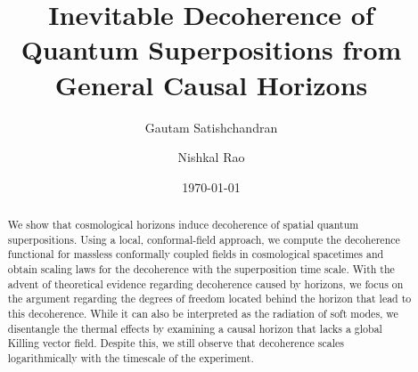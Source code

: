 \documentclass[aps,twocolumn,prd,nofootinbib,longbibliography]{revtex4-2}
\numberwithin{equation}{section}
\theoremstyle{plain}
\theoremstyle{definition}
\theoremstyle{remark}
\begin{document}
\title{Inevitable Decoherence of Quantum Superpositions from General Causal Horizons}

\author{Gautam Satishchandran }
\author{Nishkal Rao }

\date{\today}

\begin{abstract}
\noindent We show that cosmological horizons induce decoherence of spatial quantum superpositions. Using a local, conformal-field approach, we compute the decoherence functional for massless conformally coupled fields in cosmological spacetimes and obtain scaling laws for the decoherence with the superposition time scale. With the advent of theoretical evidence regarding decoherence caused by horizons, we focus on the argument regarding the degrees of freedom located behind the horizon that lead to this decoherence. While it can also be interpreted as the radiation of soft modes, we disentangle the thermal effects by examining a causal horizon that lacks a global Killing vector field. Despite this, we still observe that decoherence scales logarithmically with the timescale of the experiment.
\end{abstract}
\maketitle

%
%
%
%

\end{document}
